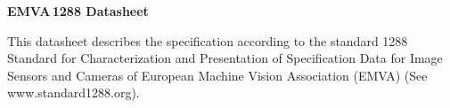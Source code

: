 \documentclass[a4paper,twoside,12pt,american,hidelinks]{article}
\title{}
\author{}
\date{}
\begin{document}
\newcommand{\TheReportSection}{}
\newcommand{\ReportSection}[1]{\renewcommand{\TheReportSection}{#1}}

\newsavebox\wtmkbox
\savebox\wtmkbox{\tikz[color=red,opacity=0.3]\node{%
\newwatermark*[
allpages, angle=45.0, scale=8.0, xpos=-20, ypos=15
]{\usebox\wtmkbox}

}}

\ReportSection{EMVA\,1288 Datasheet}
\pagestyle{fancy}
\scriptsize
\textbf{EMVA\,1288 Datasheet}
\vspace*{5mm}

\begin{minipage}[t]{0.975\linewidth}
This datasheet describes the specification according to the standard 1288
Standard for Characterization and Presentation of Specification Data for
Image Sensors and Cameras of European Machine Vision Association (EMVA)
(See www.standard1288.org).
\end{minipage}
\vspace*{5mm}

\end{document}
